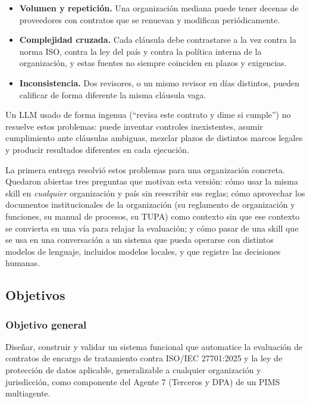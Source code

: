 \documentclass[12pt,letterpaper]{article}
\begin{document}
\begin{itemize}
  \item \textbf{Volumen y repetición.} Una organización mediana puede tener decenas de proveedores con contratos que se renuevan y modifican periódicamente.
  \item \textbf{Complejidad cruzada.} Cada cláusula debe contrastarse a la vez contra la norma ISO, contra la ley del país y contra la política interna de la organización, y estas fuentes no siempre coinciden en plazos y exigencias.
  \item \textbf{Inconsistencia.} Dos revisores, o un mismo revisor en días distintos, pueden calificar de forma diferente la misma cláusula vaga.
\end{itemize}

Un LLM usado de forma ingenua (``revisa este contrato y dime si cumple'') no resuelve estos problemas: puede inventar controles inexistentes, asumir cumplimiento ante cláusulas ambiguas, mezclar plazos de distintos marcos legales y producir resultados diferentes en cada ejecución.

La primera entrega resolvió estos problemas para una organización concreta. Quedaron abiertas tres preguntas que motivan esta versión: cómo usar la misma skill en \emph{cualquier} organización y país sin reescribir sus reglas; cómo aprovechar los documentos institucionales de la organización (su reglamento de organización y funciones, su manual de procesos, su TUPA) como contexto sin que ese contexto se convierta en una vía para relajar la evaluación; y cómo pasar de una skill que se usa en una conversación a un sistema que pueda operarse con distintos modelos de lenguaje, incluidos modelos locales, y que registre las decisiones humanas.

\subsection{Objetivos}

\subsubsection{Objetivo general}

Diseñar, construir y validar un sistema funcional que automatice la evaluación de contratos de encargo de tratamiento contra ISO/IEC 27701:2025 y la ley de protección de datos aplicable, generalizable a cualquier organización y jurisdicción, como componente del Agente 7 (Terceros y DPA) de un PIMS multiagente.
\end{document}

